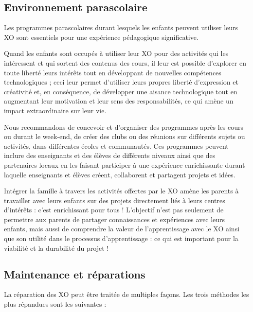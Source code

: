 \documentclass[12pt]{article}
\begin{document}
\subsection{Environnement parascolaire}
\label{sec-10-2}



Les programmes parascolaires durant lesquels les enfants peuvent utiliser
leurs XO sont essentiels pour une expérience pédagogique significative.

Quand les enfants sont occupés à utiliser leur XO pour des activités qui
les intéressent et qui sortent des contenus des cours, il leur est possible
d'explorer en toute liberté leurs intérêts tout en développant de nouvelles
compétences technologiques ; ceci leur permet d'utiliser leurs propres
liberté d'expression et créativité et, en conséquence, de développer une
aisance technologique tout en augmentant leur motivation et leur sens des
responsabilités, ce qui amène un impact extraordinaire sur leur vie.

Nous recommandons de concevoir et d'organiser des programmes après les
cours ou durant le week-end, de créer des clubs ou des réunions sur
différents sujets ou activités, dans différentes écoles et communautés. Ces
programmes peuvent inclure des enseignants et des élèves de différents
niveaux ainsi que des partenaires locaux en les faisant participer à une
expérience enrichissante durant laquelle enseignants et élèves créent,
collaborent et partagent projets et idées.

Intégrer la famille à travers les activités offertes par le XO amène les
parents à travailler avec leurs enfants sur des projets directement liés à
leurs centres d'intérêts : c'est enrichissant pour tous ! L'objectif n'est
pas seulement de permettre aux parents de partager connaissances et
expériences avec leurs enfants, mais aussi de comprendre la valeur de
l'apprentissage avec le XO ainsi que son utilité dans le processus
d'apprentissage : ce qui est important pour la viabilité et la durabilité
du projet !
\subsection{Maintenance et réparations}
\label{sec-10-3}



La réparation des XO peut être traitée de multiples façons. Les trois
méthodes les plus répandues sont les suivantes :
\end{document}
